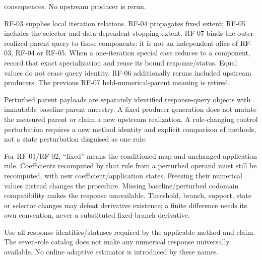 {{\begin{description}[style=nextline,leftmargin=0pt,labelwidth=0pt,labelsep=0pt]
consequences. No upstream producer is rerun.
\end{description}
RF-03 supplies local iteration relations. RF-04 propagates fixed extent;
RF-05 includes the selector and data-dependent stopping extent. RF-07 binds
the outer realized-parent query to those components: it is not an independent
alias of RF-03, RF-04 or RF-05. When a one-iteration special case reduces to a
component, record that exact specialization and reuse its bound response/status.
Equal values do not erase query identity. RF-06 additionally reruns included
upstream producers. The previous RF-07 held-numerical-parent meaning is retired.

Perturbed parent payloads are separately identified response-query objects
with immutable baseline-parent ancestry. A fixed producer generation does
not mutate the measured parent or claim a new upstream realization.
A rule-changing control perturbation requires a new method identity and
explicit comparison of methods, not a state perturbation disguised as one rule.

For RF-01/RF-02, ``fixed'' means the conditioned map and unchanged application
rule. Coefficients recomputed by that rule from a perturbed operand must still
be recomputed, with new coefficient/application states. Freezing their numerical
values instead changes the procedure. Missing baseline/perturbed codomain
compatibility makes the response unavailable. Threshold, branch, support,
state or selector changes may defeat derivative existence; a finite difference
needs its own convention, never a substituted fixed-branch derivative.

Use all response identities/statuses required by the applicable method and
claim. The seven-role catalog does not make any numerical response universally
available. No online adaptive estimator is introduced by these names.
}}
